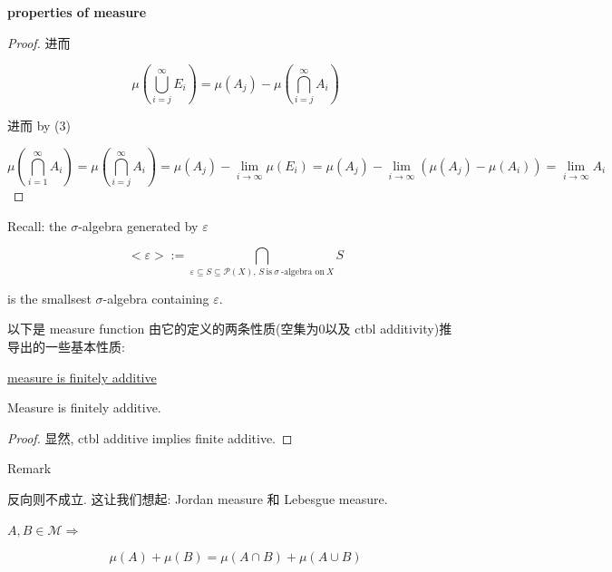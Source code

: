 \documentclass{qlnotes-export}
\begin{document}
\begin{theorem}{\protect{}\label{kn-properties-of-measure}{\textbf{properties
of measure}}}
\begin{enumerate}
\begin{proof}
  进而

  \[\mu(\bigcup\limits_{i = j}^{\infty}E_{i}) = \mu(A_{j}) - \mu(\bigcap\limits_{i = j}^{\infty}A_{i})\]

  进而 by (3)

  \[\mu(\bigcap\limits_{i = 1}^{\infty}A_{i}) = \mu(\bigcap\limits_{i = j}^{\infty}A_{i}) = \mu(A_{j}) - \lim\limits_{i\rightarrow\infty}\mu(E_{i}) = \mu(A_{j}) - \lim\limits_{i\rightarrow\infty}(\mu(A_{j}) - \mu(A_{i})) = \lim\limits_{i\rightarrow\infty}A_{i}\]

  \end{proof}
\end{enumerate}

\end{theorem}

Recall: the \(\sigma\)-algebra generated by \(\varepsilon\)

\[< \varepsilon > := \bigcap\limits_{\varepsilon \subseteq S \subseteq \mathcal{P}(X),\, S\ \text{is}\ \sigma\ \text{-algebra on}\ X}S\]

is the smallsest \(\sigma\)-algebra containing \(\varepsilon\).

以下是 measure function 由它的定义的两条性质(空集为0以及 ctbl additivity)推导出的一些基本性质:

\begin{lemma}{\href{https://qiulinfan.github.io/notes/math/measure-theory/\#kn-measure-is-finitely-additive}{measure
is finitely additive}}

Measure is finitely additive.

\end{lemma}

\begin{proof}

显然, ctbl additive implies finite additive.

\end{proof}

\begin{qlremark}{Remark}

反向则不成立. 这让我们想起: Jordan measure 和 Lebesgue measure.

\end{qlremark}

\begin{lemma}

\(A,B \in \mathcal{M}\Longrightarrow\)

\[\mu(A) + \mu(B) = \mu(A \cap B) + \mu(A \cup B)\]

\end{lemma}
\end{document}
